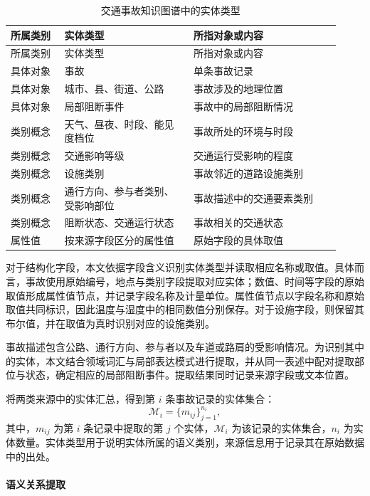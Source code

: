 \begingroup
\small
\begin{longtable}{@{}p{0.15\linewidth}p{0.36\linewidth}p{0.41\linewidth}@{}}
\caption{交通事故知识图谱中的实体类型}\label{tab:ch2-entity-types}\\
\toprule
所属类别 & 实体类型 & 所指对象或内容 \\
\midrule
\endfirsthead
\toprule
所属类别 & 实体类型 & 所指对象或内容 \\
\midrule
\endhead
\bottomrule
\endfoot
具体对象 & 事故 & 单条事故记录 \\
具体对象 & 城市、县、街道、公路 & 事故涉及的地理位置 \\
具体对象 & 局部阻断事件 & 事故中的局部阻断情况 \\
类别概念 & 天气、昼夜、时段、能见度档位 & 事故所处的环境与时段 \\
类别概念 & 交通影响等级 & 交通运行受影响的程度 \\
类别概念 & 设施类别 & 事故邻近的道路设施类别 \\
类别概念 & 通行方向、参与者类别、受影响部位 & 事故描述中的交通要素类别 \\
类别概念 & 阻断状态、交通运行状态 & 事故相关的交通状态 \\
属性值 & 按来源字段区分的属性值 & 原始字段的具体取值 \\
\end{longtable}
\endgroup

对于结构化字段，本文依据字段含义识别实体类型并读取相应名称或取值\cite{zhangxin2026traffic}。具体而言，事故使用原始编号，地点与类别字段提取对应实体；数值、时间等字段的原始取值形成属性值节点，并记录字段名称及计量单位。属性值节点以字段名称和原始取值共同标识，因此温度与湿度中的相同数值分别保存。对于设施字段，则保留其布尔值，并在取值为真时识别对应的设施类别。

事故描述包含公路、通行方向、参与者以及车道或路肩的受影响情况。为识别其中的实体，本文结合领域词汇与局部表达模式进行提取，并从同一表述中配对提取部位与状态，确定相应的局部阻断事件。提取结果同时记录来源字段或文本位置。

将两类来源中的实体汇总，得到第 $i$ 条事故记录的实体集合：
\begin{equation}
\mathcal{M}_i=\{m_{ij}\}_{j=1}^{n_i},
\label{eq:ch2-entity-mentions}
\end{equation}
其中，$m_{ij}$ 为第 $i$ 条记录中提取的第 $j$ 个实体，$\mathcal{M}_i$ 为该记录的实体集合，$n_i$ 为实体数量。实体类型用于说明实体所属的语义类别，来源信息用于记录其在原始数据中的出处。

\paragraph{语义关系提取}


